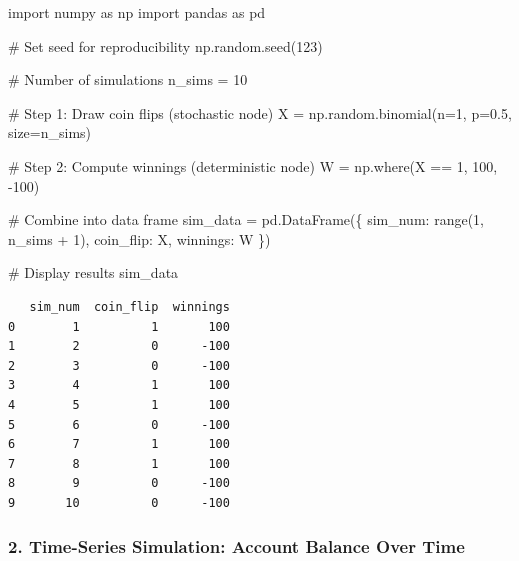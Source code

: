 \documentclass[
  letterpaper,
  DIV=11,
  numbers=noendperiod]{scrartcl}
\newenvironment{Shaded}{\begin{snugshade}}{\end{snugshade}}
\newcommand{\BuiltInTok}[1]{\textcolor[rgb]{0.00,0.23,0.31}{#1}}
\newcommand{\CommentTok}[1]{\textcolor[rgb]{0.37,0.37,0.37}{#1}}
\newcommand{\DecValTok}[1]{\textcolor[rgb]{0.68,0.00,0.00}{#1}}
\newcommand{\FloatTok}[1]{\textcolor[rgb]{0.68,0.00,0.00}{#1}}
\newcommand{\ImportTok}[1]{\textcolor[rgb]{0.00,0.46,0.62}{#1}}
\newcommand{\NormalTok}[1]{\textcolor[rgb]{0.00,0.23,0.31}{#1}}
\newcommand{\OperatorTok}[1]{\textcolor[rgb]{0.37,0.37,0.37}{#1}}
\newcommand{\StringTok}[1]{\textcolor[rgb]{0.13,0.47,0.30}{#1}}
\theoremstyle{definition}
\theoremstyle{remark}
\begin{document}
\begin{Shaded}
\begin{Highlighting}[]
\ImportTok{import}\NormalTok{ numpy }\ImportTok{as}\NormalTok{ np}
\ImportTok{import}\NormalTok{ pandas }\ImportTok{as}\NormalTok{ pd}

\CommentTok{\# Set seed for reproducibility}
\NormalTok{np.random.seed(}\DecValTok{123}\NormalTok{)}

\CommentTok{\# Number of simulations}
\NormalTok{n\_sims }\OperatorTok{=} \DecValTok{10}

\CommentTok{\# Step 1: Draw coin flips (stochastic node)}
\NormalTok{X }\OperatorTok{=}\NormalTok{ np.random.binomial(n}\OperatorTok{=}\DecValTok{1}\NormalTok{, p}\OperatorTok{=}\FloatTok{0.5}\NormalTok{, size}\OperatorTok{=}\NormalTok{n\_sims)}

\CommentTok{\# Step 2: Compute winnings (deterministic node)}
\NormalTok{W }\OperatorTok{=}\NormalTok{ np.where(X }\OperatorTok{==} \DecValTok{1}\NormalTok{, }\DecValTok{100}\NormalTok{, }\OperatorTok{{-}}\DecValTok{100}\NormalTok{)}

\CommentTok{\# Combine into data frame}
\NormalTok{sim\_data }\OperatorTok{=}\NormalTok{ pd.DataFrame(\{}
    \StringTok{\textquotesingle{}sim\_num\textquotesingle{}}\NormalTok{: }\BuiltInTok{range}\NormalTok{(}\DecValTok{1}\NormalTok{, n\_sims }\OperatorTok{+} \DecValTok{1}\NormalTok{),}
    \StringTok{\textquotesingle{}coin\_flip\textquotesingle{}}\NormalTok{: X,}
    \StringTok{\textquotesingle{}winnings\textquotesingle{}}\NormalTok{: W}
\NormalTok{\})}

\CommentTok{\# Display results}
\NormalTok{sim\_data}
\end{Highlighting}
\end{Shaded}

\begin{verbatim}
   sim_num  coin_flip  winnings
0        1          1       100
1        2          0      -100
2        3          0      -100
3        4          1       100
4        5          1       100
5        6          0      -100
6        7          1       100
7        8          1       100
8        9          0      -100
9       10          0      -100
\end{verbatim}

\subsubsection{2. Time-Series Simulation: Account Balance Over
Time}\label{time-series-simulation-account-balance-over-time}
\end{document}
